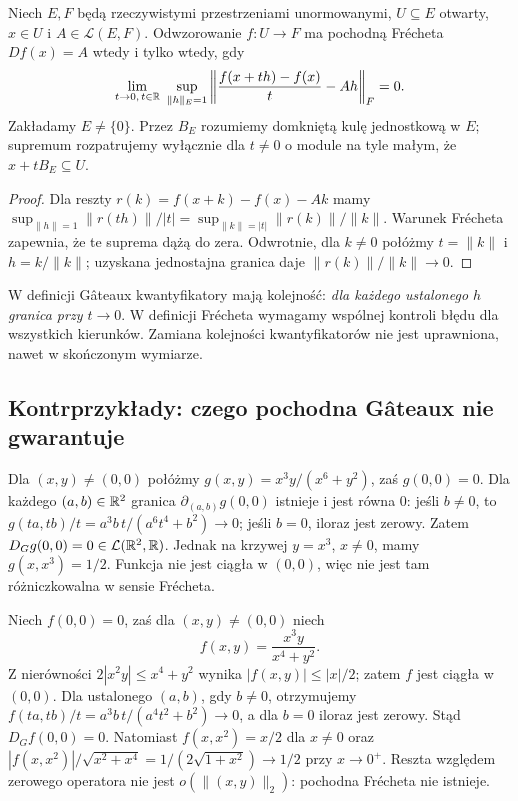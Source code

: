 \begin{stwierdzenie}
\label{prop:uniform-directions14}
Niech $E,F$ będą rzeczywistymi przestrzeniami unormowanymi, $U\subseteq E$ otwarty, $x\in U$ i $A\in\mathcal L(E,F)$. Odwzorowanie $f:U\to F$ ma pochodną Frécheta $Df(x)=A$ wtedy i tylko wtedy, gdy
\[
\lim_{t\to0,\,t\in\mathbb R}\ \sup_{\|h\|_E=1}
\left\|\frac{f(x+th)-f(x)}{t}-Ah\right\|_F=0.
\]
Zakładamy $E\ne\{0\}$. Przez $B_E$ rozumiemy domkniętą kulę jednostkową w $E$; supremum rozpatrujemy wyłącznie dla $t\ne0$ o module na tyle małym, że $x+tB_E\subseteq U$.
\end{stwierdzenie}
\begin{proof}
Dla reszty $r(k)=f(x+k)-f(x)-Ak$ mamy
$\sup_{\|h\|=1}\|r(th)\|/|t|=\sup_{\|k\|=|t|}\|r(k)\|/\|k\|$.
Warunek Frécheta zapewnia, że te suprema dążą do zera. Odwrotnie, dla $k\ne0$ połóżmy $t=\|k\|$ i $h=k/\|k\|$; uzyskana jednostajna granica daje $\|r(k)\|/\|k\|\to0$.
\end{proof}

\begin{uwaga}
\label{rem:quantifiers14}
W definicji Gâteaux kwantyfikatory mają kolejność: \emph{dla każdego ustalonego $h$ granica przy $t\to0$}. W definicji Frécheta wymagamy wspólnej kontroli błędu dla wszystkich kierunków. Zamiana kolejności kwantyfikatorów nie jest uprawniona, nawet w skończonym wymiarze.
\end{uwaga}

\subsection{Kontrprzykłady: czego pochodna Gâteaux nie gwarantuje}

\begin{przyklad}
\label{ex:directional-discontinuous14}
Dla $(x,y)\ne(0,0)$ połóżmy
$g(x,y)=x^3y/(x^6+y^2)$, zaś $g(0,0)=0$. Dla każdego $(a,b)\in\mathbb R^2$ granica $\partial_{(a,b)}g(0,0)$ istnieje i jest równa $0$: jeśli $b\ne0$, to $g(ta,tb)/t=a^3b\,t/(a^6t^4+b^2)\to0$; jeśli $b=0$, iloraz jest zerowy. Zatem $D_Gg(0,0)=0\in\mathcal L(\mathbb R^2,\mathbb R)$. Jednak na krzywej $y=x^3$, $x\ne0$, mamy $g(x,x^3)=1/2$. Funkcja nie jest ciągła w $(0,0)$, więc nie jest tam różniczkowalna w sensie Frécheta.
\end{przyklad}

\begin{przyklad}
\label{ex:continuous-gateaux-not-frechet14}
Niech $f(0,0)=0$, zaś dla $(x,y)\ne(0,0)$ niech
\[
f(x,y)=\frac{x^3y}{x^4+y^2}.
\]
Z nierówności $2|x^2y|\le x^4+y^2$ wynika $|f(x,y)|\le|x|/2$; zatem $f$ jest ciągła w $(0,0)$. Dla ustalonego $(a,b)$, gdy $b\ne0$, otrzymujemy
$f(ta,tb)/t=a^3b\,t/(a^4t^2+b^2)\to0$, a dla $b=0$ iloraz jest zerowy. Stąd $D_Gf(0,0)=0$. Natomiast $f(x,x^2)=x/2$ dla $x\ne0$ oraz
$|f(x,x^2)|/\sqrt{x^2+x^4}=1/(2\sqrt{1+x^2})\to1/2$ przy $x\to0^+$. Reszta względem zerowego operatora nie jest $o(\|(x,y)\|_2)$: pochodna Frécheta nie istnieje.
\end{przyklad}

